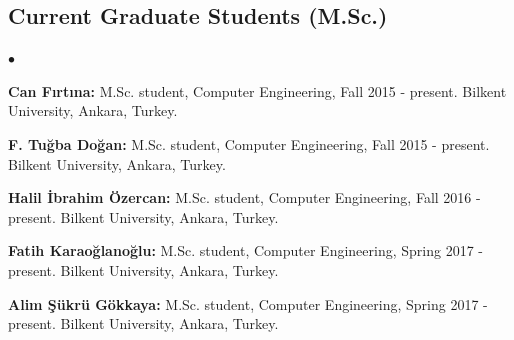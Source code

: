 \documentclass[margin,line]{res}
\newenvironment{list2}{
  \begin{list}{$\bullet$}{%
      \setlength{\itemsep}{0in}
      \setlength{\parsep}{0in} \setlength{\parskip}{0in}
      \setlength{\topsep}{0in} \setlength{\partopsep}{0in} 
      \setlength{\leftmargin}{0.2in}}}{\end{list}}
\begin{document}
\begin{resume}
\subsection{\small \sc Current Graduate Students (M.Sc.)}
\begin{list2}
\item
  {\bf Can Fırtına:} M.Sc. student, Computer Engineering, Fall 2015 - present.
  Bilkent University, Ankara, Turkey. 
\item
  {\bf F. Tuğba Doğan:} M.Sc. student, Computer Engineering, Fall 2015 - present.
  Bilkent University, Ankara, Turkey. 
\item
  {\bf Halil İbrahim Özercan:} M.Sc. student, Computer Engineering, Fall 2016 - present.
  Bilkent University, Ankara, Turkey. 
\item
  {\bf Fatih Karaoğlanoğlu:} M.Sc. student, Computer Engineering, Spring 2017 - present.
  Bilkent University, Ankara, Turkey. 
\item
  {\bf Alim Şükrü Gökkaya:} M.Sc. student, Computer Engineering, Spring 2017 - present.
  Bilkent University, Ankara, Turkey. 
\end{list2}

\vspace*{-.4cm}

\end{resume}
\end{document}
